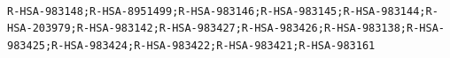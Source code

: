 \documentclass[
  letterpaper,
  DIV=11,
  numbers=noendperiod]{scrartcl}
\begin{document}
\begin{verbatim}
                                                                                                                                                                                                                                                                                                                                                                                                                                                                                                                                                                                                                                                                                                                                                                                                                                                                                                                                                                                                                                                                                                                                                                                                                                                                                                                                                                                                                                                                                                                                                                                                                                                                                                                                                                                                                                                                                                                                                                                                                                                                                                                                                                                                                                                                                                                                                                                                                                                                                                                                                                                                          R-HSA-983148;R-HSA-8951499;R-HSA-983146;R-HSA-983145;R-HSA-983144;R-HSA-203979;R-HSA-983142;R-HSA-983427;R-HSA-983426;R-HSA-983138;R-HSA-983425;R-HSA-983424;R-HSA-983422;R-HSA-983421;R-HSA-983161

\end{verbatim}
\end{document}
